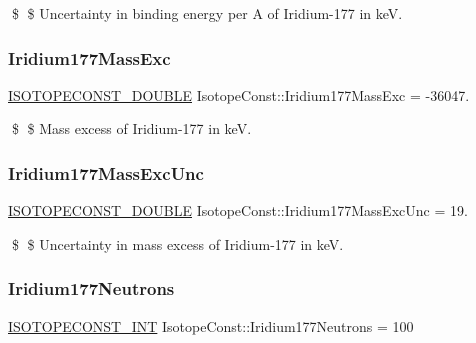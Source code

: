 \$ \$ Uncertainty in binding energy per A of Iridium-\/177 in keV. \mbox{\label{group___isotope_const-_iridium-_ir177_gae3c4fccd40a03242c4b4a9ca08afb5a4}} 
\subsubsection{\texorpdfstring{Iridium177\+Mass\+Exc}{Iridium177MassExc}}
{\footnotesize\ttfamily \mbox{\hyperlink{group___isotope_const-_macros_ga8f45a7272ce02c0b4c65c44636ed719a}{I\+S\+O\+T\+O\+P\+E\+C\+O\+N\+S\+T\+\_\+\+D\+O\+U\+B\+LE}} Isotope\+Const\+::\+Iridium177\+Mass\+Exc = -\/36047.}

\$ \$ Mass excess of Iridium-\/177 in keV. \mbox{\label{group___isotope_const-_iridium-_ir177_ga5bf16ed53ce35d0049d652529971b750}} 
\subsubsection{\texorpdfstring{Iridium177\+Mass\+Exc\+Unc}{Iridium177MassExcUnc}}
{\footnotesize\ttfamily \mbox{\hyperlink{group___isotope_const-_macros_ga8f45a7272ce02c0b4c65c44636ed719a}{I\+S\+O\+T\+O\+P\+E\+C\+O\+N\+S\+T\+\_\+\+D\+O\+U\+B\+LE}} Isotope\+Const\+::\+Iridium177\+Mass\+Exc\+Unc = 19.}

\$ \$ Uncertainty in mass excess of Iridium-\/177 in keV. \mbox{\label{group___isotope_const-_iridium-_ir177_ga5a58134a6f56386cb0e886d2fe888a2a}} 
\subsubsection{\texorpdfstring{Iridium177\+Neutrons}{Iridium177Neutrons}}
{\footnotesize\ttfamily \mbox{\hyperlink{group___isotope_const-_macros_ga5f18360b3e99483a35c32d789e62621c}{I\+S\+O\+T\+O\+P\+E\+C\+O\+N\+S\+T\+\_\+\+I\+NT}} Isotope\+Const\+::\+Iridium177\+Neutrons = 100}

